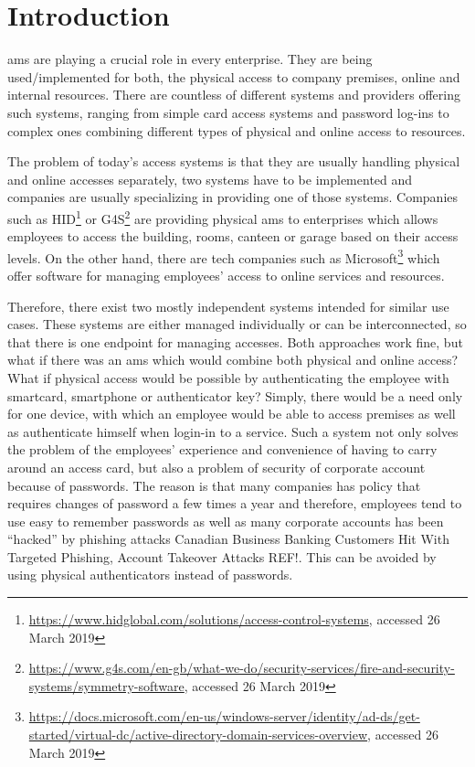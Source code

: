 \section{Introduction}
% 
\acrfull{ams} are playing a crucial role in every enterprise. They are being used/implemented for both, the physical access to company premises, online and internal resources. There are countless of different systems and providers offering such systems, ranging from simple card access systems and password log-ins to complex ones combining different types of physical and online access to resources. 

The problem of today’s access systems is that they are usually handling physical and online accesses separately, two systems have to be implemented and companies are usually specializing in providing one of those systems. Companies such as HID\footnote{\url{https://www.hidglobal.com/solutions/access-control-systems}, accessed 26 March 2019} or G4S\footnote{\url{https://www.g4s.com/en-gb/what-we-do/security-services/fire-and-security-systems/symmetry-software}, accessed 26 March 2019} are providing physical \acrshort{ams} to enterprises which allows employees to access the building, rooms, canteen or garage based on their access levels. On the other hand, there are tech companies such as Microsoft\footnote{\url{https://docs.microsoft.com/en-us/windows-server/identity/ad-ds/get-started/virtual-dc/active-directory-domain-services-overview}, accessed 26 March 2019} which offer software for managing employees’ access to online services and resources.

Therefore, there exist two mostly independent systems intended for similar use cases. These systems are either managed individually or can be interconnected, so that there is one endpoint for managing accesses. Both approaches work fine, but what if there was an \acrshort{ams} which would combine both physical and online access? What if physical access would be possible by authenticating the employee with smartcard, smartphone or authenticator key? Simply, there would be a need only for one device, with which an employee would be able to access premises as well as authenticate himself when login-in to a service. Such a system not only solves the problem of the employees’ experience and convenience of having to carry around an access card, but also a problem of security of corporate account because of passwords. The reason is that many companies has policy that requires changes of password a few times a year and therefore, employees tend to use easy to remember passwords  as well as many corporate accounts has been “hacked” by phishing attacks\cite{} Canadian Business Banking Customers Hit With Targeted Phishing, Account Takeover Attacks REF!. This can be avoided by using physical authenticators instead of passwords.

